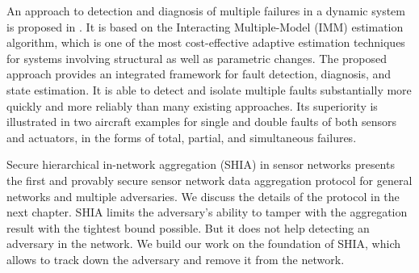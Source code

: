 	An approach to detection and diagnosis of multiple failures in a dynamic system is proposed in \cite{zhang1998detection}. 
	It is based on the Interacting Multiple-Model (IMM) estimation algorithm, which is one of the most cost-effective adaptive estimation techniques for systems involving structural as well as parametric changes. 
	The proposed approach provides an integrated framework for fault detection, diagnosis, and state estimation. 
	It is able to detect and isolate multiple faults substantially more quickly and more reliably than many existing approaches. 
	Its superiority is illustrated in two aircraft examples for single and double faults of both sensors and actuators, in the forms of total, partial, and simultaneous failures. 

	Secure hierarchical in-network aggregation (SHIA) in sensor networks \cite{chan2006secure} presents the first and provably secure sensor network data aggregation protocol for general networks and multiple adversaries. 
	We discuss the details of the protocol in the next chapter. 
	SHIA limits the adversary's ability to tamper with the aggregation result with the tightest bound possible.
	But it does not help detecting an adversary in the network.
	We build our work on the foundation of SHIA, which allows to track down the adversary and remove it from the network.